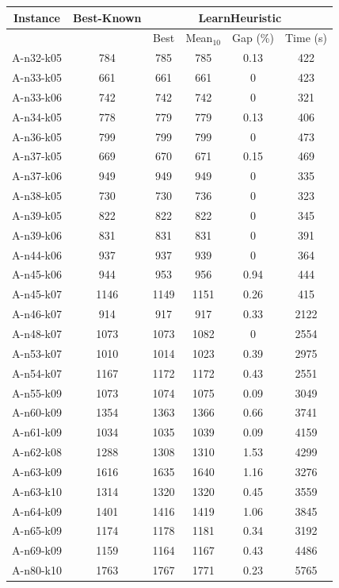 \documentclass[a4paper,11pt]{article}%
\begin{document}
\begin{table}[h!]
\begin{center}
\begin{tabular}{|@{}c@{}|@{}c@{}|@{}c@{}|@{}c@{}|@{}c@{}|@{}c@{}|}
\hline
 Instance & Best-Known & \multicolumn{4}{c|}{LearnHeuristic}  \\
 \hline
 & & Best & Mean$_{10}$ & Gap (\%) & Time (s) \\ 
 \hline
 A-n32-k05 & 784 & 785 & 785 & 0.13 & 422  \\
 \hline
 A-n33-k05   & 661 & 661 & 661 &0 & 423   \\
  \hline
   A-n33-k06 & 742 & 742 & 742 &0 & 321  \\
 \hline
   A-n34-k05 & 778 & 779 & 779 &0.13 & 406  \\
  \hline
   A-n36-k05 & 799 & 799 & 799 & 0 & 473  \\
 \hline
  A-n37-k05  & 669 & 670 & 671 & 0.15 & 469  \\
  \hline
  A-n37-k06 & 949 & 949 & 949 & 0 & 335 \\
 \hline
  A-n38-k05  & 730 & 730 & 736 & 0 & 323 \\
 \hline
 A-n39-k05 & 822 & 822 & 822 & 0 & 345 \\
 \hline
  A-n39-k06  & 831 & 831 & 831 & 0 & 391   \\
 \hline
   A-n44-k06 & 937 & 937 & 939 & 0 & 364   \\
  \hline
   A-n45-k06 & 944 & 953 & 956 & 0.94 & 444  \\
 \hline 
  A-n45-k07  & 1146 & 1149 & 1151 & 0.26 & 415 \\
  \hline
  A-n46-k07  & 914 & 917& 917&0.33 & 2122  \\
  \hline
  A-n48-k07 & 1073 & 1073 & 1082 &0 & 2554  \\
 \hline
  A-n53-k07  & 1010 & 1014 & 1023 &0.39 & 2975   \\
  \hline
  A-n54-k07  & 1167 & 1172 & 1172 &0.43 & 2551   \\
  \hline
  A-n55-k09 & 1073 & 1074 & 1075 &0.09 & 3049  \\
 \hline 
   A-n60-k09 & 1354 & 1363 & 1366 &0.66 & 3741   \\
  \hline 
  A-n61-k09  & 1034 & 1035 & 1039 &0.09 & 4159  \\
  \hline
    A-n62-k08  & 1288 & 1308 & 1310 &1.53 & 4299   \\
  \hline
    A-n63-k09  & 1616 & 1635 & 1640 &1.16 & 3276   \\
  \hline
    A-n63-k10  & 1314 & 1320 &1320 &0.45 & 3559   \\
  \hline
    A-n64-k09  & 1401 & 1416 & 1419 &1.06 & 3845   \\
  \hline
    A-n65-k09  & 1174 & 1178 & 1181 &0.34 & 3192   \\
  \hline
    A-n69-k09  & 1159 & 1164 & 1167 & 0.43 & 4486   \\
  \hline
    A-n80-k10  & 1763 & 1767 & 1771 & 0.23 & 5765   \\
  \hline
\end{tabular}
\end{center}
\end{table}
\end{document}
